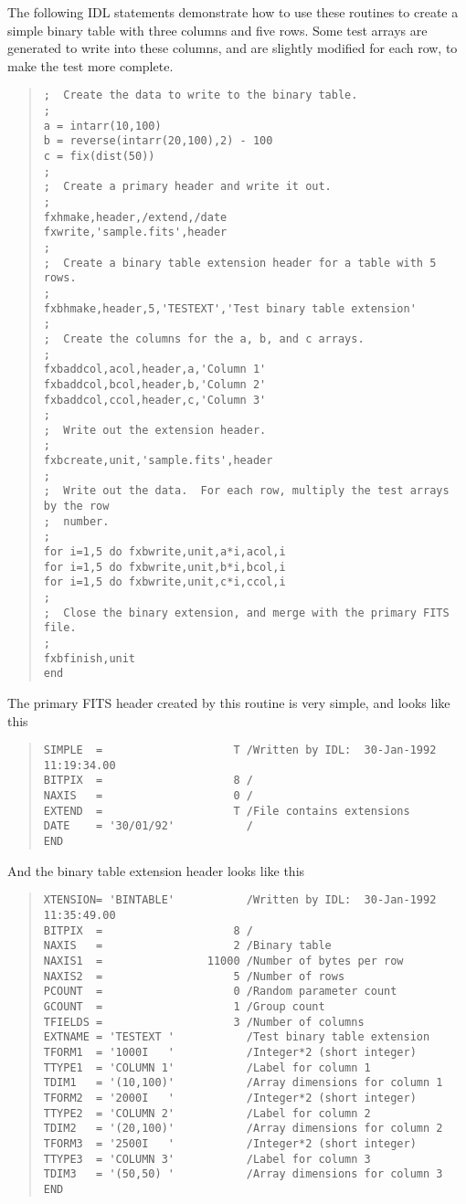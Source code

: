 The following IDL statements demonstrate how to use these routines to create a
simple binary table with three columns and five rows.  Some test arrays are
generated to write into these columns, and are slightly modified for each row,
to make the test more complete.
%
\begin{quote}
\begin{verbatim}
;  Create the data to write to the binary table.
;
a = intarr(10,100)
b = reverse(intarr(20,100),2) - 100
c = fix(dist(50))
;
;  Create a primary header and write it out.
;
fxhmake,header,/extend,/date
fxwrite,'sample.fits',header
;
;  Create a binary table extension header for a table with 5 rows.
;
fxbhmake,header,5,'TESTEXT','Test binary table extension'
;
;  Create the columns for the a, b, and c arrays.
;
fxbaddcol,acol,header,a,'Column 1'
fxbaddcol,bcol,header,b,'Column 2'
fxbaddcol,ccol,header,c,'Column 3'
;
;  Write out the extension header.
;
fxbcreate,unit,'sample.fits',header
;
;  Write out the data.  For each row, multiply the test arrays by the row
;  number.
;
for i=1,5 do fxbwrite,unit,a*i,acol,i
for i=1,5 do fxbwrite,unit,b*i,bcol,i
for i=1,5 do fxbwrite,unit,c*i,ccol,i
;
;  Close the binary extension, and merge with the primary FITS file.
;
fxbfinish,unit
end
\end{verbatim}
\end{quote}
%
The primary FITS header created by this routine is very simple, and looks like
this
%
\begin{quote}
\begin{verbatim}
SIMPLE  =                    T /Written by IDL:  30-Jan-1992 11:19:34.00
BITPIX  =                    8 /
NAXIS   =                    0 /
EXTEND  =                    T /File contains extensions
DATE    = '30/01/92'           /
END
\end{verbatim}
\end{quote}
%
And the binary table extension header looks like this
%
\begin{quote}
\begin{verbatim}
XTENSION= 'BINTABLE'           /Written by IDL:  30-Jan-1992 11:35:49.00
BITPIX  =                    8 /
NAXIS   =                    2 /Binary table
NAXIS1  =                11000 /Number of bytes per row
NAXIS2  =                    5 /Number of rows
PCOUNT  =                    0 /Random parameter count
GCOUNT  =                    1 /Group count
TFIELDS =                    3 /Number of columns
EXTNAME = 'TESTEXT '           /Test binary table extension
TFORM1  = '1000I   '           /Integer*2 (short integer)
TTYPE1  = 'COLUMN 1'           /Label for column 1
TDIM1   = '(10,100)'           /Array dimensions for column 1
TFORM2  = '2000I   '           /Integer*2 (short integer)
TTYPE2  = 'COLUMN 2'           /Label for column 2
TDIM2   = '(20,100)'           /Array dimensions for column 2
TFORM3  = '2500I   '           /Integer*2 (short integer)
TTYPE3  = 'COLUMN 3'           /Label for column 3
TDIM3   = '(50,50) '           /Array dimensions for column 3
END
\end{verbatim}
\end{quote}


